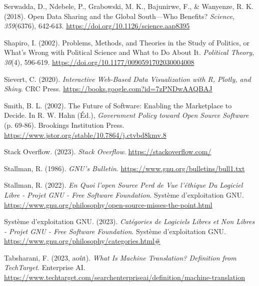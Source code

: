 \documentclass[
  letterpaper,
  DIV=11,
  numbers=noendperiod,
  oneside]{scrreprt}
\newlength{\cslhangindent}
\newlength{\cslentryspacingunit} %
\newenvironment{CSLReferences}[2] %
 {%
  \setlength{\parindent}{0pt}
  \ifodd #1
  \let\oldpar\par
  \def\par{\hangindent=\cslhangindent\oldpar}
  \fi
  \setlength{\parskip}{#2\cslentryspacingunit}
 }%
 {}
\begin{document}
\begin{CSLReferences}{1}{0}
\leavevmode{}%
Serwadda, D., Ndebele, P., Grabowski, M. K., Bajunirwe, F., \& Wanyenze,
R. K. (2018). Open Data Sharing and the {Global South}---{Who} Benefits?
\emph{Science}, \emph{359}(6376), 642‑643.
\url{https://doi.org/10.1126/science.aap8395}

\leavevmode{}%
Shapiro, I. (2002). Problems, {Methods}, and {Theories} in the {Study}
of {Politics}, or {What}'s {Wrong} with {Political Science} and {What}
to {Do About} It. \emph{Political Theory}, \emph{30}(4), 596‑619.
\url{https://doi.org/10.1177/0090591702030004008}

\leavevmode{}%
Sievert, C. (2020). \emph{Interactive {Web-Based Data Visualization}
with {R}, Plotly, and Shiny}. CRC Press.
\url{https://books.google.com?id=7zPNDwAAQBAJ}

\leavevmode{}%
Smith, B. L. (2002). The {Future} of {Software}: {Enabling} the
{Marketplace} to {Decide}. In R. W. Hahn (Éd.), \emph{Government
{Policy} toward {Open Source Software}} (p. 69‑86). Brookings
Institution Press.
\url{https://www.jstor.org/stable/10.7864/j.ctvbd8kmv.8}

\leavevmode{}%
Stack Overflow. (2023). \emph{Stack {Overflow}}.
\url{https://stackoverflow.com/}

\leavevmode{}%
Stallman, R. (1986). \emph{{GNU}'s {Bulletin}}.
\url{https://www.gnu.org/bulletins/bull1.txt}

\leavevmode{}%
Stallman, R. (2022). \emph{En Quoi l'open Source Perd de Vue l'éthique
Du Logiciel Libre - {Projet GNU} - {Free Software Foundation}}. Système
d'exploitation GNU.
\url{https://www.gnu.org/philosophy/open-source-misses-the-point.html}

\leavevmode{}%
Système d'exploitation GNU. (2023). \emph{Catégories de Logiciels Libres
et Non Libres - {Projet GNU} - {Free Software Foundation}}. Système
d'exploitation GNU.
\url{https://www.gnu.org/philosophy/categories.html\#}

\leavevmode{}%
Tabsharani, F. (2023, août). \emph{What Is {Machine Translation}?
{Definition} from {TechTarget}}. Enterprise AI.
\url{https://www.techtarget.com/searchenterpriseai/definition/machine-translation}


\end{CSLReferences}
\end{document}
